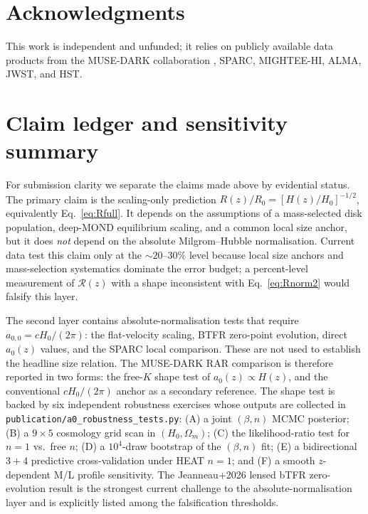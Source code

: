 \documentclass[twocolumn,letterpaper]{aastex631}
\newcommand{\azero}{a_0}
\newcommand{\azerolocal}{a_{0,0}}
\begin{document}
\section*{Acknowledgments}

This work is independent and unfunded; it relies on publicly
available data products from the MUSE-DARK collaboration
\citep{Ciocan2026RAR,Ciocan2026Halo,Jeanneau2026}, SPARC,
MIGHTEE-HI, ALMA, JWST, and HST.

\section*{Claim ledger and sensitivity summary}

For submission clarity we separate the claims made above by evidential
status.  The primary claim is the scaling-only prediction
$R(z)/R_{0}=[H(z)/H_{0}]^{-1/2}$, equivalently
Eq.~\ref{eq:Rfull}.  It depends on the assumptions of a
mass-selected disk population, deep-MOND equilibrium scaling, and a
common local size anchor, but it does \emph{not} depend on the
absolute Milgrom--Hubble normalisation.  Current data test this claim
only at the $\sim20$--$30\%$ level because local size anchors and
mass-selection systematics dominate the error budget; a percent-level
measurement of $\mathcal{R}(z)$ with a shape inconsistent with
Eq.~\ref{eq:Rnorm2} would falsify this layer.

The second layer contains absolute-normalisation tests that require
$\azerolocal=cH_0/(2\pi)$: the flat-velocity scaling, BTFR zero-point
evolution, direct $\azero(z)$ values, and the SPARC local comparison.
These are not used to establish the headline size relation.  The
MUSE-DARK RAR comparison is therefore reported in two forms: the
free-$K$ shape test of $\azero(z)\propto H(z)$, and the conventional
$cH_0/(2\pi)$ anchor as a secondary reference.  The shape test is
backed by six independent robustness exercises whose outputs are
collected in \texttt{publication/a0\_robustness\_tests.py}:
(A) a joint $(\beta, n)$ MCMC posterior; (B) a $9\!\times\!5$
cosmology grid scan in $(H_{0}, \Omega_{m})$; (C) the
likelihood-ratio test for $n\!=\!1$ vs.\ free $n$; (D) a
$10^{4}$-draw bootstrap of the $(\beta, n)$ fit; (E) a
bidirectional $3\!+\!4$ predictive cross-validation under HEAT
$n\!=\!1$; and (F) a smooth $z$-dependent M/L profile
sensitivity.  The Jeanneau+2026 lensed bTFR zero-evolution result
is the strongest current challenge to the absolute-normalisation
layer and is explicitly listed among the falsification thresholds.
\end{document}

